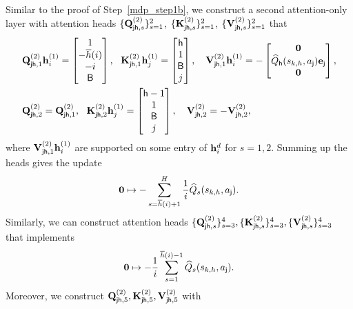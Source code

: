 Similar to the proof of Step~\ref{mdp_step1b}, we construct a second attention-only layer with attention heads   $\{{\mathbf Q}_{{\mathsf{j}}{\mathsf{h}},s}^{(2)}\}^2_{s=1}$, $\{{\mathbf K}_{{\mathsf{j}}{\mathsf{h}},s}^{(2)}\}^2_{s=1}$, $\{{\mathbf V}_{{\mathsf{j}}{\mathsf{h}},s}^{(2)}\}^2_{s=1}$ that
\begin{align*}
  & {\mathbf Q}_{{\mathsf{j}}{\mathsf{h}},1}^{(2)}{\mathbf h}_i^{(1)} =\begin{bmatrix}
       1\\-\overline{h}(i)\\-i\\
       {\mathsf{B}}
   \end{bmatrix},~~ {\mathbf K}_{{\mathsf{j}}{\mathsf{h}},1}^{(2)}{\mathbf h}_j^{(1)} =\begin{bmatrix}
   {\mathsf{h}}\\ 1 \\{\mathsf{B}}\\ j
   \end{bmatrix},~~~
   {\mathbf V}_{{\mathsf{j}}{\mathsf{h}},1}^{(2)}{\mathbf h}_i^{(1)} =-\begin{bmatrix}
       {\mathbf 0} \\  {\widehat{{Q}}}_{\mathsf{h}}({s}_{k,h},{a}_{\mathsf{j}}){\mathbf e}_{{\mathsf{j}}}\\
       {\mathbf 0}
   \end{bmatrix},
   \\
   & {\mathbf Q}_{{\mathsf{j}}{\mathsf{h}},2}^{(2)}={\mathbf Q}_{{\mathsf{j}}{\mathsf{h}},1}^{(2)},~~ {\mathbf K}_{{\mathsf{j}}{\mathsf{h}},2}^{(2)}{\mathbf h}_j^{(1)} =\begin{bmatrix}
   {\mathsf{h}}-1\\ 1 \\{\mathsf{B}}\\ j
   \end{bmatrix},~~~
   {\mathbf V}_{{\mathsf{j}}{\mathsf{h}},2}^{(2)} =-  {\mathbf V}_{{\mathsf{j}}{\mathsf{h}},2}^{(2)},
\end{align*} where $ {\mathbf V}_{{\mathsf{j}}{\mathsf{h}},1}^{(2)}{\mathbf h}_i^{(1)}$ are supported on some entry of ${\mathbf h}_i^{d}$ for $s=1,2$. 
Summing up the heads gives the update
\begin{align*}
    {\mathbf 0}\mapsto -\sum_{s=\overline{h}(i)+1}^{{H}}\frac{1}{i}{\widehat{{Q}}}_{s}({s}_{k,h},{a}_{\mathsf{j}}).
\end{align*}
Similarly, we can construct attention heads   $\{{\mathbf Q}_{{\mathsf{j}}{\mathsf{h}},s}^{(2)}\}^4_{s=3},\{{\mathbf K}_{{\mathsf{j}}{\mathsf{h}},s}^{(2)}\}^4_{s=3},\{{\mathbf V}_{{\mathsf{j}}{\mathsf{h}},s}^{(2)}\}^4_{s=3}$ that implements
\begin{align*}
    {\mathbf 0}\mapsto -\frac{1}{i}\sum_{s=1}^{\overline{h}(i)-1}{{\widehat{{Q}}}_{s}({s}_{k,h},{a}_{\mathsf{j}})}.
\end{align*}
Moreover, we construct 
${\mathbf Q}_{{\mathsf{j}}{\mathsf{h}},5}^{(2)},{\mathbf K}_{{\mathsf{j}}{\mathsf{h}},5}^{(2)},{\mathbf V}_{{\mathsf{j}}{\mathsf{h}},5}^{(2)}$ with
